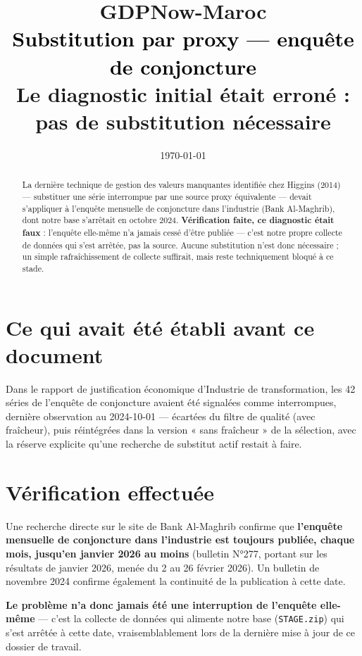 \documentclass[11pt,a4paper]{article}
\title{\vspace{-1.3cm}\textcolor{bleuprincip}{\Huge\bfseries GDPNow-Maroc}\\[0.3cm]
\textcolor{black}{\Large Substitution par proxy --- enquête de conjoncture}\\[0.15cm]
\textcolor{orangealerte}{\large Le diagnostic initial était erroné : pas de substitution nécessaire}}
\author{}
\date{\today}
\begin{document}
\maketitle
\thispagestyle{empty}

\begin{abstract}
\noindent La dernière technique de gestion des valeurs manquantes identifiée chez Higgins (2014) --- substituer une série interrompue par une source proxy équivalente --- devait s'appliquer à l'enquête mensuelle de conjoncture dans l'industrie (Bank Al-Maghrib), dont notre base s'arrêtait en octobre 2024. \textbf{Vérification faite, ce diagnostic était faux} : l'enquête elle-même n'a jamais cessé d'être publiée --- c'est notre propre collecte de données qui s'est arrêtée, pas la source. Aucune substitution n'est donc nécessaire ; un simple rafraîchissement de collecte suffirait, mais reste techniquement bloqué à ce stade.
\end{abstract}

\section{Ce qui avait été établi avant ce document}

Dans le rapport de justification économique d'Industrie de transformation, les 42 séries de l'enquête de conjoncture avaient été signalées comme interrompues, dernière observation au 2024-10-01 --- écartées du filtre de qualité (avec fraîcheur), puis réintégrées dans la version « sans fraîcheur » de la sélection, avec la réserve explicite qu'une recherche de substitut actif restait à faire.

\section{Vérification effectuée}

\begin{alertebox}
Une recherche directe sur le site de Bank Al-Maghrib confirme que \textbf{l'enquête mensuelle de conjoncture dans l'industrie est toujours publiée, chaque mois, jusqu'en janvier 2026 au moins} (bulletin N°277, portant sur les résultats de janvier 2026, menée du 2 au 26 février 2026). Un bulletin de novembre 2024 confirme également la continuité de la publication à cette date.

\textbf{Le problème n'a donc jamais été une interruption de l'enquête elle-même} --- c'est la collecte de données qui alimente notre base (\texttt{STAGE.zip}) qui s'est arrêtée à cette date, vraisemblablement lors de la dernière mise à jour de ce dossier de travail.
\end{alertebox}
\end{document}
